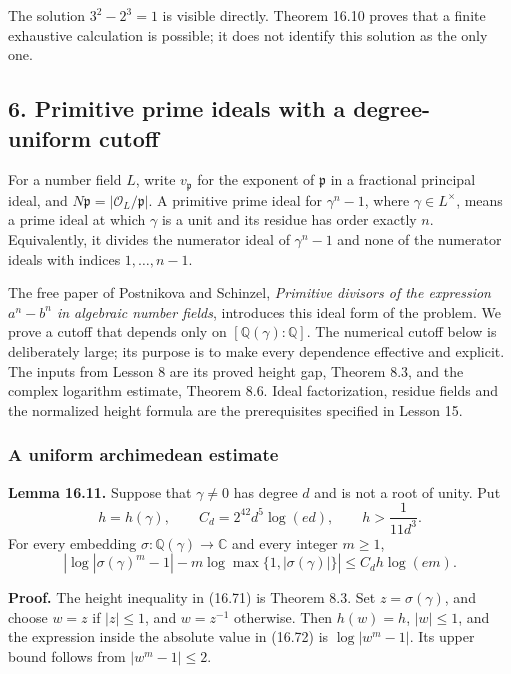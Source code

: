 \documentclass[
  11pt,
  a4paper,
]{article}
\begin{document}
The solution \(3^2-2^3=1\) is visible directly. Theorem 16.10 proves
that a finite exhaustive calculation is possible; it does not identify
this solution as the only one.

\subsection{6. Primitive prime ideals with a degree-uniform
cutoff}\label{primitive-prime-ideals-with-a-degree-uniform-cutoff}

For a number field \(L\), write \(v_{\mathfrak p}\) for the exponent of
\(\mathfrak p\) in a fractional principal ideal, and
\(N\mathfrak p=|\mathcal O_L/\mathfrak p|\). A primitive prime ideal for
\(\gamma^n-1\), where \(\gamma\in L^\times\), means a prime ideal at
which \(\gamma\) is a unit and its residue has order exactly \(n\).
Equivalently, it divides the numerator ideal of \(\gamma^n-1\) and none
of the numerator ideals with indices \(1,\ldots,n-1\).

The free paper of Postnikova and Schinzel, \emph{Primitive divisors of
the expression \(a^n-b^n\) in algebraic number fields}, introduces this
ideal form of the problem. We prove a cutoff that depends only on
\([\mathbb Q(\gamma):\mathbb Q]\). The numerical cutoff below is
deliberately large; its purpose is to make every dependence effective
and explicit. The inputs from Lesson 8 are its proved height gap,
Theorem 8.3, and the complex logarithm estimate, Theorem 8.6. Ideal
factorization, residue fields and the normalized height formula are the
prerequisites specified in Lesson 15.

\subsubsection{A uniform archimedean
estimate}\label{a-uniform-archimedean-estimate}

\textbf{Lemma 16.11.} Suppose that \(\gamma\ne0\) has degree \(d\) and
is not a root of unity. Put \[
 h=h(\gamma),\qquad
 C_d=2^{42}d^5\log(ed),\qquad h>\frac1{11d^3}.
 \tag{16.71}
\] For every embedding
\(\sigma:\mathbb Q(\gamma)\longrightarrow\mathbb C\) and every integer
\(m\ge1\), \[
 \left|\log|\sigma(\gamma)^m-1|
       -m\log\max\{1,|\sigma(\gamma)|\}\right|
 \le C_d h\log(em).
 \tag{16.72}
\]

\textbf{Proof.} The height inequality in (16.71) is Theorem 8.3. Set
\(z=\sigma(\gamma)\), and choose \(w=z\) if \(|z|\le1\), and
\(w=z^{-1}\) otherwise. Then \(h(w)=h\), \(|w|\le1\), and the expression
inside the absolute value in (16.72) is \(\log|w^m-1|\). Its upper bound
follows from \(|w^m-1|\le2\).
\end{document}
